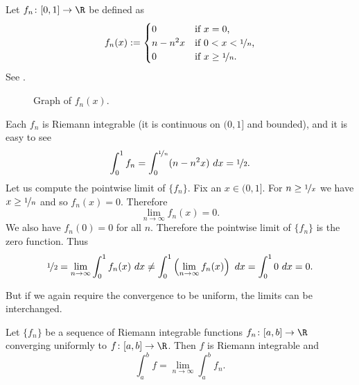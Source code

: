 \documentclass[12pt]{book}
\begin{document}
\begin{example}
Let $f_n \colon [0,1] \to \R$
be defined as
\begin{equation*}
f_n(x) :=
\begin{cases}
0 &  \text{if $x = 0$,}\\
n-n^2x &  \text{if $0 < x < \nicefrac{1}{n}$,}\\
0 &  \text{if $x \geq \nicefrac{1}{n}$.}
\end{cases}
\end{equation*}
See .

\begin{figure}[h!t]
\begin{center}

\caption{Graph of $f_n(x)$.%
\label{intconvcntr:fig}}
\end{center}
\end{figure}

Each $f_n$ is Riemann integrable (it is continuous on $(0,1]$ and bounded),
and it is easy to see
\begin{equation*}
\int_0^1 f_n =
\int_0^{\nicefrac{1}{n}} (n-n^2x)~dx = \nicefrac{1}{2} .
\end{equation*}
Let us compute the pointwise limit of $\{ f_n \}$.
Fix an $x \in (0,1]$.
For $n \geq \nicefrac{1}{x}$
we have $x \geq \nicefrac{1}{n}$ and so $f_n(x) = 0$.
Therefore
\begin{equation*}
\lim_{n \to \infty} f_n(x) = 0.
\end{equation*}
We also have $f_n(0) = 0$ for all $n$.
Therefore the pointwise
limit of $\{ f_n \}$ is the zero function.
Thus
\begin{equation*}
\nicefrac{1}{2} =
\lim_{n\to\infty}
\int_0^1 f_n (x)~dx
\not=
\int_0^1
\left(
\lim_{n\to\infty}
f_n(x)\right)~dx
=
\int_0^1 0~dx = 0 .
\end{equation*}
\end{example}

But
if we again require the convergence to be uniform, the limits can
be interchanged.

\begin{thm} \label{integralinterchange:thm}
Let $\{ f_n \}$ be a sequence of Riemann integrable
functions
$f_n \colon [a,b] \to \R$
converging uniformly to $f \colon [a,b]
\to \R$.
Then $f$ is Riemann integrable and
\begin{equation*}
\int_a^b f = \lim_{n\to\infty} \int_a^b f_n .
\end{equation*}
\end{thm}
\end{document}
